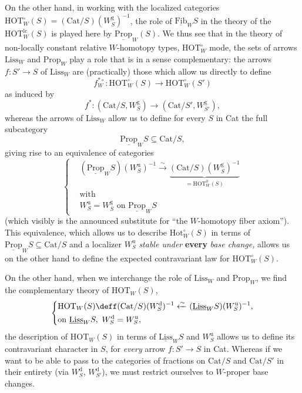 On the other hand, in working with the localized categories $\mathrm{HOT}^\circ_W(S) = (\mathrm{Cat}/S)(W^{\mathrm{g}}_S)^{-1}$, the role of $\underline{\mathrm{Fib}}_W S$ in the theory of the $\mathrm{HOT}^{\mathrm{lc}}_W(S)$ is played here by $\underline{\mathrm{Prop}}_W(S)$. We thus see that in the theory of non-locally constant relative $W$-homotopy types, $\mathrm{HOT}^\circ_W$ mode, the sets of arrows $\mathrm{Liss}_W$ and $\mathrm{Prop}_W$ play a role that is in a sense complementary: the arrows $f : S' \longrightarrow S$ of $\mathrm{Liss}_W$ are (practically) those which allow us directly to define
\[
f^{*\circ}_W : \mathrm{HOT}^\circ_W(S) \longrightarrow \mathrm{HOT}^\circ_W(S')
\]
as induced by
\[
f^* : (\mathrm{Cat}/S, W^{\mathrm{g}}_S) \longrightarrow (\mathrm{Cat}/S', W^{\mathrm{g}}_{S'}),
\]
whereas the arrows of $\mathrm{Liss}_W$ allow us to define for every $S$ in Cat the full subcategory
\[
\underline{\mathrm{Prop}}_W S \subseteq \mathrm{Cat}/S,
\]
giving rise to an equivalence of categories
\[
\left\{
\begin{aligned}
&(\underline{\mathrm{Prop}}_W S)(W^{\mathrm{u}}_S)^{-1} \xrightarrow{\sim} \underbrace{(\mathrm{Cat}/S)(W^{\mathrm{g}}_S)^{-1}}_{= \mathrm{HOT}^0_W(S)} %
\\
&\text{with}\\
&W^{\mathrm{u}}_S = W^{\mathrm{g}}_S \text{ on } \underline{\mathrm{Prop}}_W S
\end{aligned}
\right.
\]
(which visibly is the announced substitute for ``the $W$-homotopy fiber axiom''). This
equivalence, which allows us to describe $\mathrm{Hot}^\circ_W(S)$ in terms of $\underline{\mathrm{Prop}}_W S \subseteq \mathrm{Cat}/S$ and a localizer $W^{\mathrm{u}}_S$ \textit{stable under} \textbf{every} \textit{base change,} allows us on the other hand to define the expected contravariant law for $\mathrm{HOT}^\circ_W(S)$.


On the other hand, when we interchange the role of $\mathrm{Liss}_W$ and $\mathrm{Prop}_W$, we find the complementary theory of $\mathrm{HOT}_W(S)$,
\[
\left\{
\begin{aligned}
&\mathrm{HOT}_W(S) \deff (\mathrm{Cat}/S)(W^{\mathrm{d}}_S)^{-1} \xleftarrow{\sim} (\underline{\mathrm{Liss}}_W S)(W^{\mathrm{u}}_S)^{-1},\\
&\text{on } \underline{\mathrm{Liss}}_W S,\ W^{\mathrm{d}}_S = W^{\mathrm{u}}_S,
\end{aligned}
\right.
\]
the description of $\mathrm{HOT}_W(S)$ in terms of $\underline{\mathrm{Liss}}_W S$ and $W^{\mathrm{u}}_S$ allows us to define its contravariant character in $S$, for \textit{every} arrow $f : S' \longrightarrow S$ in Cat. Whereas if we want to be able to pass to the categories of fractions on $\mathrm{Cat}/S$ and $\mathrm{Cat}/S'$ in their entirety (via $W^{\mathrm{d}}_S$, $W^{\mathrm{d}}_{S'}$), we must restrict ourselves to $W$-proper base changes.

